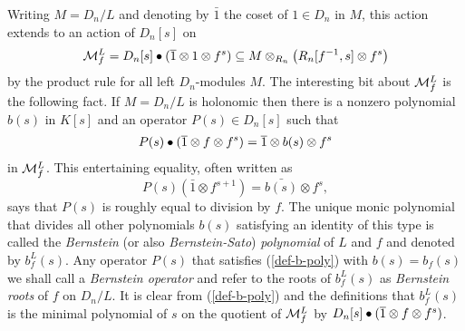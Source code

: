 Writing $M=D_n/L$ and denoting by $\bar 1$ the coset of $1\in D_n$ in
$M$, 
this action extends to an action
 of $D_n[s]$ on 
\begin{eqnarray}
{\mathcal M}^L_f=D_n[s]\bullet(\overline{1}\otimes 1\otimes f^s)\subseteq 
M\otimes_{R_n} \left(R_n[f^{-1},s]\otimes f^s\right)
\end{eqnarray}
by the product rule for all left $D_n$-modules $M$.
The interesting bit about ${\mathcal M}^L_f$
is the following fact.
If $M=D_n/L$ is holonomic 
then
there is a nonzero polynomial $b(s)$ in $K[s]$ and an
operator $P(s)\in D_n[s]$ such that 
\begin{eqnarray}
\label{def-b-poly}
P(s)\bullet(\overline{1}\otimes f\otimes f^s)=
\overline{1}\otimes b(s)\otimes f^s
\end{eqnarray}
in ${\mathcal M}^L_f$.
This entertaining equality, often written as 
\[
P(s)\left( \bar 1\otimes f^{s+1}\right)=\bar{b(s)}\otimes f^s,
\] 
says that $P(s)$ is roughly equal to
division by $f$.
The unique monic polynomial that divides 
all other polynomials $b(s)$ satisfying an identity of this type is called the
{\em Bernstein} (or also {\em Bernstein-Sato}) {\em
polynomial} of $L$ and 
$f$ and denoted by $b_f^L(s)$.
Any operator $P(s)$ that satisfies (\ref{def-b-poly}) with
$b(s)=b_f(s)$ 
 we shall call a 
{\em Bernstein operator} and refer
to the roots of $b_f^L(s)$ as {\em Bernstein roots} 
of $f$ on $D_n/L$.
It is clear from (\ref{def-b-poly}) and the definitions that
$b^L_f(s)$ is the minimal polynomial of $s$ on the quotient of
${\mathcal M}^L_f$ by $D_n[s]\bullet(\overline{1}\otimes f\otimes f^s)$. 

